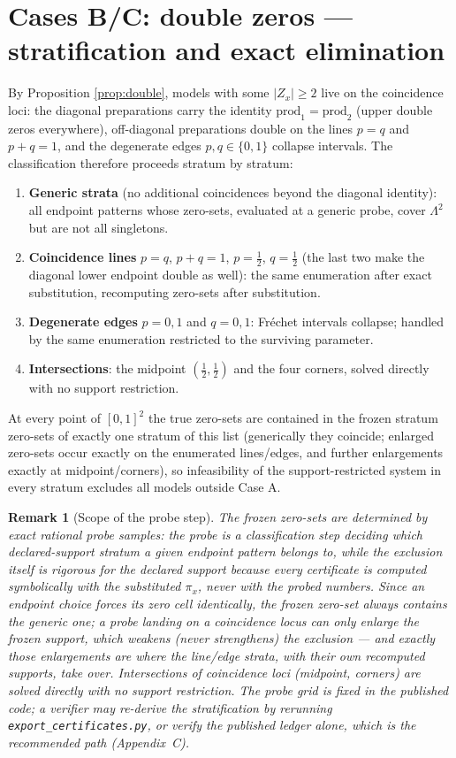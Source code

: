 \documentclass[11pt,a4paper]{article}
\newtheorem{remark}{Remark}
\begin{document}
\section{Cases B/C: double zeros --- stratification and exact elimination}
\label{sec:BC}
By Proposition \ref{prop:double}, models with some $|Z_x|\ge 2$ live on the coincidence loci: the diagonal preparations carry the identity $\mathrm{prod}_1=\mathrm{prod}_2$ (upper double zeros everywhere), off-diagonal preparations double on the lines $p=q$ and $p+q=1$, and the degenerate edges $p,q\in\{0,1\}$ collapse intervals. The classification therefore proceeds stratum by stratum:
\begin{enumerate}
\item \textbf{Generic strata} (no additional coincidences beyond the diagonal identity): all endpoint patterns whose zero-sets, evaluated at a generic probe, cover $\Lambda^2$ but are not all singletons.
\item \textbf{Coincidence lines} $p=q$, $p+q=1$, $p=\tfrac12$, $q=\tfrac12$ (the last two make the diagonal lower endpoint double as well): the same enumeration after exact substitution, recomputing zero-sets after substitution.
\item \textbf{Degenerate edges} $p=0,1$ and $q=0,1$: Fr\'echet intervals collapse; handled by the same enumeration restricted to the surviving parameter.
\item \textbf{Intersections}: the midpoint $(\tfrac12,\tfrac12)$ and the four corners, solved directly with no support restriction.
\end{enumerate}
At every point of $[0,1]^2$ the true zero-sets are contained in the frozen stratum zero-sets of exactly one stratum of this list (generically they coincide; enlarged zero-sets occur exactly on the enumerated lines/edges, and further enlargements exactly at midpoint/corners), so infeasibility of the support-restricted system in every stratum excludes all models outside Case A.

\begin{remark}[Scope of the probe step]\label{rem:probe}
The frozen zero-sets are determined by exact rational probe samples: the probe is a \emph{classification} step deciding which declared-support stratum a given endpoint pattern belongs to, while the exclusion itself is rigorous for the declared support because every certificate is computed symbolically with the substituted $\pi_x$, never with the probed numbers. Since an endpoint choice forces its zero cell identically, the frozen zero-set always \emph{contains} the generic one; a probe landing on a coincidence locus can only enlarge the frozen support, which weakens (never strengthens) the exclusion --- and exactly those enlargements are where the line/edge strata, with their own recomputed supports, take over. Intersections of coincidence loci (midpoint, corners) are solved directly with no support restriction. The probe grid is fixed in the published code; a verifier may re-derive the stratification by rerunning \texttt{export\_certificates.py}, or verify the published ledger alone, which is the recommended path (Appendix~C).
\end{remark}
\end{document}
